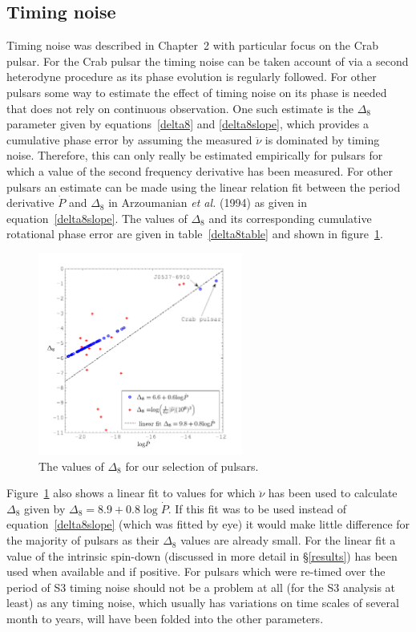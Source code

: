 \subsection{Timing noise}
Timing noise was described in Chapter~2 with particular focus on the Crab pulsar. For the Crab
pulsar the timing noise can be taken account of via a second heterodyne procedure as its phase
evolution is regularly followed. For other pulsars some way to estimate the effect of timing noise
on its phase is needed that does not rely on continuous observation. One such estimate is the
$\Delta_8$ parameter given by equations~\ref{delta8} and \ref{delta8slope}, which provides a
cumulative phase error by assuming the measured $\ddot{\nu}$ is dominated by timing noise. 
Therefore, this can only really be estimated empirically for pulsars for which a value of the second
frequency derivative has been measured. For other pulsars an estimate can be made using the linear
relation fit between the period derivative $\dot{P}$ and $\Delta_8$ in Arzoumanian {\it et al.}
(1994) \cite{Arzoumanian:1994} as given in equation~\ref{delta8slope}. The values of $\Delta_8$ and
its corresponding cumulative rotational phase error are given in table~\ref{delta8table} and shown
in figure~\ref{delta8figure}.
\begin{figure}[!htbp]
\begin{center}
\includegraphics[width=0.6\textwidth]{figs/delta8}
\caption{The values of $\Delta_8$ for our selection of pulsars.}\label{delta8figure}
\end{center}
\end{figure}
Figure~\ref{delta8figure} also shows a linear fit to values for which $\ddot{\nu}$ has been used to
calculate $\Delta_8$ given by $\Delta_8 = 8.9 + 0.8\log{\dot{P}}$. If this fit was to be used
instead of equation~\ref{delta8slope} (which was fitted by eye) it would make little difference for
the majority of pulsars as their $\Delta_8$ values are already small. For the linear fit a value of
the intrinsic spin-down (discussed in more detail in \S\ref{results}) has been used when available
and if positive. For pulsars which were re-timed over the period of S3 timing noise should not be a
problem at all (for the S3 analysis at least) as any timing noise, which usually has variations on
time scales of several month to years, will have been folded into the other parameters.


